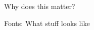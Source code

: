 \documentclass[../index.tex]{subfiles}
\begin{document}
\renewcommand{\currenttitle}{Why does this matter?}
\begin{frame}{\currenttitle}
%
%
\end{frame}

\renewcommand{\currenttitle}{Fonts: What stuff looks like}
\begin{frame}{\currenttitle}
%
%
%
%
\end{frame}
\end{document}
